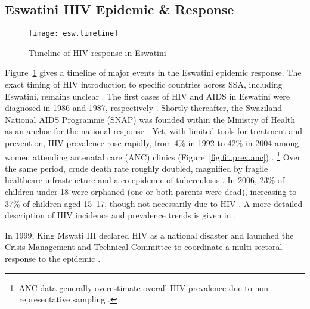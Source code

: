 \subsection{Eswatini HIV Epidemic \& Response}\label{intro.esw.hiv}
\begin{figure}
  \centering
  \texttt{[image: esw.timeline]}
  \caption{Timeline of HIV response in Eswatini}
  \label{fig:esw.timeline}
\end{figure}
Figure~\ref{fig:esw.timeline} gives a timeline of major events in the Eswatini epidemic response.
The exact timing of HIV introduction to specific countries across SSA, including Eswatini,
remains unclear \cite{Iliffe2005}.
The first cases of HIV and AIDS in Eswatini
were diagnosed in 1986 and 1987, respectively \cite{Whiteside2007}.
Shortly thereafter, the Swaziland National AIDS Programme (SNAP) was founded
within the Ministry of Health as an anchor for the national response \cite{Mabuza2017}.
Yet, with limited tools for treatment and prevention,
HIV prevalence rose rapidly, from 4\% in 1992 to 42\% in 2004
among women attending antenatal care (ANC) clinics
(Figure~\ref{fig:fit.prev.anc}) \cite{NERCHA2012}.%
\footnote{ANC data generally overestimate overall HIV prevalence
  due to non-representative sampling \cite{Gouws2008,Marsh2014}.}
Over the same period, crude death rate roughly doubled, magnified by
fragile healthcare infrastructure and a co-epidemic of tuberculosis \cite{Whiteside2007}.
In 2006, 23\% of children under 18 were orphaned (one or both parents were dead),
increasing to 37\% of children aged 15--17,
though not necessarily due to HIV \cite{SDHS2006}.
A more detailed description of HIV incidence and prevalence trends
is given in .
\par
In 1999, King Mswati III declared HIV as a national disaster and
launched the Crisis Management and Technical Committee
to coordinate a multi-sectoral response to the epidemic \cite{Mabuza2017}.
